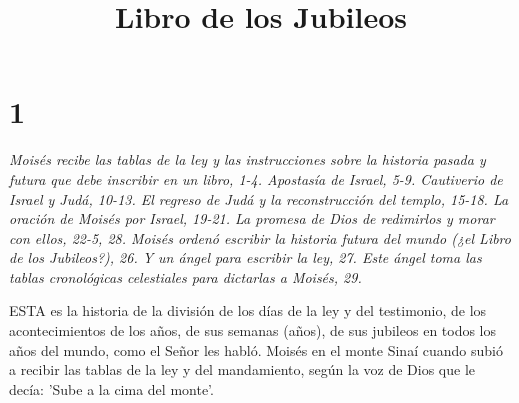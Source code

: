 

\title{Libro de los Jubileos}

\chapter{1}

\par \textit{Moisés recibe las tablas de la ley y las instrucciones sobre la historia pasada y futura que debe inscribir en un libro, 1-4. Apostasía de Israel, 5-9. Cautiverio de Israel y Judá, 10-13. El regreso de Judá y la reconstrucción del templo, 15-18. La oración de Moisés por Israel, 19-21. La promesa de Dios de redimirlos y morar con ellos, 22-5, 28. Moisés ordenó escribir la historia futura del mundo (¿el Libro de los Jubileos?), 26. Y un ángel para escribir la ley, 27. Este ángel toma las tablas cronológicas celestiales para dictarlas a Moisés, 29.}

\par ESTA es la historia de la división de los días de la ley y del testimonio, de los acontecimientos de los años, de sus semanas (años), de sus jubileos en todos los años del mundo, como el Señor les habló. Moisés en el monte Sinaí cuando subió a recibir las tablas de la ley y del mandamiento, según la voz de Dios que le decía: 'Sube a la cima del monte'.


